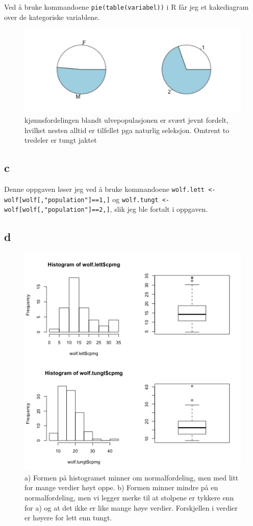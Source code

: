 Ved å bruke kommandoene \texttt{pie(table(variabel))} i R får jeg et kakediagram over de kategoriske variablene. 

\begin{figure}[H]
		\centering
		\includegraphics[width=0.7\linewidth]{wolf_sex.png}
		\caption{kjønnsfordelingen blandt ulvepopulasjonen er svært jevnt fordelt, hvilket nesten alltid er tilfellet pga naturlig seleksjon. Omtrent to tredeler er tungt jaktet}
		\label{fig:sex_population}
\end{figure}

\subsection*{c}

Denne oppgaven løser jeg ved å bruke kommandoene \texttt{wolf.lett <- wolf[wolf[,"population"]==1,]} og \texttt{wolf.tungt <- wolf[wolf[,"population"]==2,]}, slik jeg ble fortalt i oppgaven.

\subsection*{d}

\begin{figure}[H]
		\centering
		\includegraphics[width=0.7\linewidth]{wolf_sammenlign.pdf}
		\caption{a) Formen på histogramet minner om normalfordeling, men med litt for mange verdier høyt oppe. b) Formen minner mindre på en normalfordeling, men vi legger merke til at stolpene er tykkere enn for a) og at det ikke er like mange høye verdier. Forskjellen i verdier er høyere for lett enn tungt.}
		\label{fig:sammenlign}
\end{figure}


